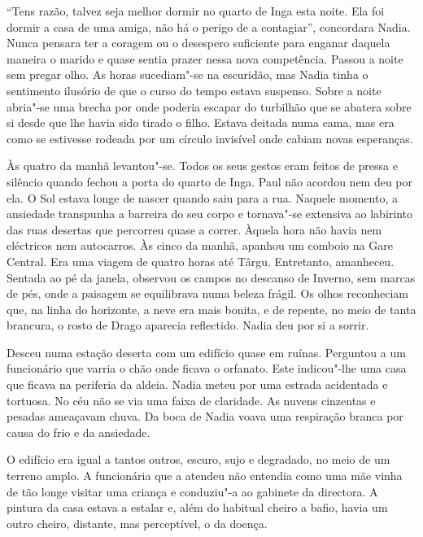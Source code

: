 ``Tens razão, talvez seja melhor dormir no quarto de Inga esta noite. Ela
foi dormir a casa de uma amiga, não há o perigo de a contagiar'',
concordara Nadia. Nunca pensara ter a coragem ou o desespero suficiente
para enganar daquela maneira o marido e quase sentia prazer nessa nova
competência. Passou a noite sem pregar olho. As horas sucediam"-se na
escuridão, mas Nadia tinha o sentimento ilusório de que o curso do tempo
estava suspenso. Sobre a noite abria"-se uma brecha por onde poderia
escapar do turbilhão que se abatera sobre si desde que lhe havia sido
tirado o filho. Estava deitada numa cama, mas era como se estivesse
rodeada por um círculo invisível onde cabiam novas esperanças.

Às quatro da manhã levantou"-se. Todos os seus gestos eram feitos de
pressa e silêncio quando fechou a porta do quarto de Inga. Paul não
acordou nem deu por ela. O Sol estava longe de nascer quando saiu para a
rua. Naquele momento, a ansiedade transpunha a barreira do seu corpo e
tornava"-se extensiva ao labirinto das ruas desertas que percorreu quase
a correr. Àquela hora não havia nem
eléctricos nem autocarros. Às cinco da manhã, apanhou um comboio na Gare
Central. Era uma viagem de quatro horas até Târgu. Entretanto,
amanheceu. Sentada ao pé da janela, observou os campos no descanso de
Inverno, sem marcas de pés, onde a paisagem se equilibrava numa beleza
frágil. Os olhos reconheciam que, na linha do horizonte, a neve era
mais bonita, e de repente, no meio de tanta brancura, o rosto de Drago
aparecia reflectido. Nadia deu por si a sorrir.

Desceu numa estação deserta com um edifício quase em ruínas. Perguntou a
um funcionário que varria o chão onde ficava o orfanato. Este
indicou"-lhe uma casa que ficava na periferia da aldeia. Nadia meteu por
uma estrada acidentada e tortuosa. No céu não se via uma faixa de
claridade. As nuvens cinzentas e pesadas ameaçavam chuva. Da boca de
Nadia voava uma respiração branca por causa do frio e da ansiedade.

O edifício era igual a tantos outros, escuro, sujo e degradado, no
meio de um terreno amplo. A funcionária que a atendeu não entendia como
uma mãe vinha de tão longe visitar uma criança e conduziu"-a ao gabinete
da directora. A pintura da casa estava a estalar e, além do habitual
cheiro a bafio, havia um outro cheiro, distante, mas perceptível, o da
doença.

